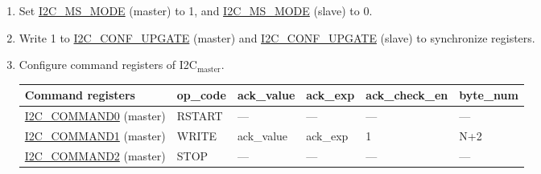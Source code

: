 \documentclass[main\_\_EN.tex]{subfiles}
\begin{document}
\begin{enumerate}
\item Set \hyperref[fielddesc:I2CMSMODE]{I2C\_MS\_MODE} (master) to 1, and \hyperref[fielddesc:I2CMSMODE]{I2C\_MS\_MODE} (slave) to 0.
\item Write 1 to \hyperref[fielddesc:I2CCONFUPGATE]{I2C\_CONF\_UPGATE} (master) and \hyperref[fielddesc:I2CCONFUPGATE]{I2C\_CONF\_UPGATE} (slave) to synchronize registers.
\item Configure command registers of I2C$_\text{master}$.

\begin{longtable}{ | p{5cm} | p{1.5cm} | p{1.5cm} | p{1.5cm} |p{2.5cm} | p{1.5cm} |}
\hline\rowcolor{lightgray}
Command registers& op\_code & ack\_value&ack\_exp&ack\_check\_en&byte\_num  \\ \hline
\hyperref[fielddesc:I2CCOMMAND0]{I2C\_COMMAND0} (master)& RSTART& ---&---&---&---  \\ \hline
\hyperref[fielddesc:I2CCOMMAND1]{I2C\_COMMAND1} (master)& WRITE& ack\_value&ack\_exp&1&N+2  \\ \hline
\hyperref[fielddesc:I2CCOMMAND2]{I2C\_COMMAND2} (master)& STOP& ---&---&---&---  \\ \hline
\end{longtable}


\end{enumerate}
\end{document}
